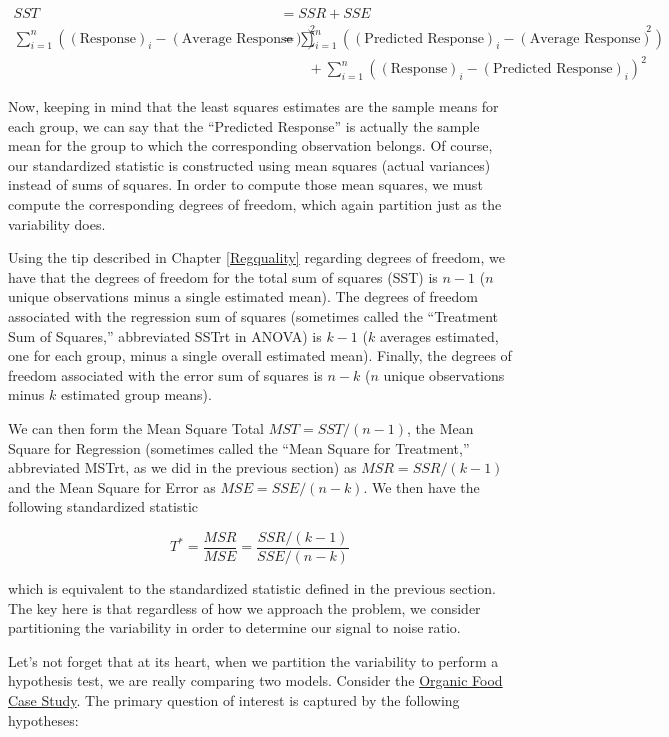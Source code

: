 \documentclass[
]{book}
\theoremstyle{plain}
\theoremstyle{mydefn}
\theoremstyle{myexmpl}
\theoremstyle{remark}
\begin{document}
\[
\begin{aligned}
  SST &= SSR + SSE \\
  \sum_{i=1}^{n} \left((\text{Response})_i - (\text{Average Response})\right)^2 &=
    \sum_{i=1}^{n} \left((\text{Predicted Response})_i - (\text{Average Response})\right)^2 \\
    &\qquad + \sum_{i=1}^{n} \left((\text{Response})_i - (\text{Predicted Response})_i\right)^2
\end{aligned}
\]

Now, keeping in mind that the least squares estimates are the sample means for each group, we can say that the ``Predicted Response'' is actually the sample mean for the group to which the corresponding observation belongs. Of course, our standardized statistic is constructed using mean squares (actual variances) instead of sums of squares. In order to compute those mean squares, we must compute the corresponding degrees of freedom, which again partition just as the variability does.

Using the tip described in Chapter \ref{Regquality} regarding degrees of freedom, we have that the degrees of freedom for the total sum of squares (SST) is \(n - 1\) (\(n\) unique observations minus a single estimated mean). The degrees of freedom associated with the regression sum of squares (sometimes called the ``Treatment Sum of Squares,'' abbreviated SSTrt in ANOVA) is \(k - 1\) (\(k\) averages estimated, one for each group, minus a single overall estimated mean). Finally, the degrees of freedom associated with the error sum of squares is \(n - k\) (\(n\) unique observations minus \(k\) estimated group means).

We can then form the Mean Square Total \(MST = SST/(n-1)\), the Mean Square for Regression (sometimes called the ``Mean Square for Treatment,'' abbreviated MSTrt, as we did in the previous section) as \(MSR = SSR/(k-1)\) and the Mean Square for Error as \(MSE = SSE/(n-k)\). We then have the following standardized statistic

\[T^* = \frac{MSR}{MSE} = \frac{SSR/(k-1)}{SSE/(n-k)}\]

which is equivalent to the standardized statistic defined in the previous section. The key here is that regardless of how we approach the problem, we consider partitioning the variability in order to determine our signal to noise ratio.

Let's not forget that at its heart, when we partition the variability to perform a hypothesis test, we are really comparing two models. Consider the \protect\hyperlink{CaseOrganic}{Organic Food Case Study}. The primary question of interest is captured by the following hypotheses:
\end{document}
